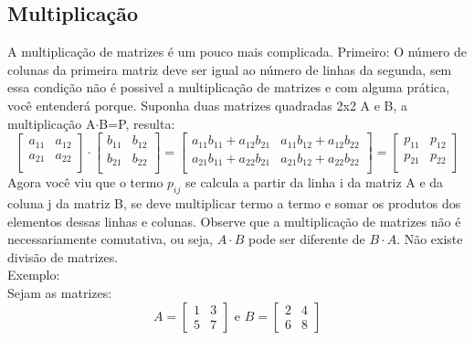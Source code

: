 \subsection{Multiplicação}
A multiplicação de matrizes é um pouco mais complicada. Primeiro: O número de colunas da primeira matriz deve ser igual ao número de linhas da segunda, sem essa condição não é possivel a multiplicação de matrizes e com alguma prática, você entenderá porque. 
Suponha duas matrizes quadradas 2x2 A e B, a multiplicação A$\cdot$B=P, resulta: 
\begin{displaymath}
\begin{bmatrix}
  a_{11} & a_{12}\\ a_{21} & a_{22}\\
\end{bmatrix}
\cdot
\begin{bmatrix}
  b_{11} & b_{12}\\ b_{21} & b_{22}\\
  \end{bmatrix}
=
\begin{bmatrix}
  a_{11}b_{11}+a_{12}b_{21} & a_{11}b_{12}+a_{12}b_{22} \\
  a_{21}b_{11}+a_{22}b_{21} & a_{21}b_{12}+a_{22}b_{22} \\
\end{bmatrix}
 =
\begin{bmatrix}
   p_{11} & p_{12} \\ p_{21} & p_{22} \\
\end{bmatrix}
\end{displaymath}
Agora você viu que o termo $p_{ij}$ se calcula a partir da linha i da matriz A e da coluna j da matriz B, se deve multiplicar termo a termo e somar os produtos dos elementos dessas linhas e colunas. Observe que a multiplicação de matrizes não é necessariamente comutativa, ou seja, $A\cdot B$ pode ser diferente de $B\cdot A$. Não existe divisão de matrizes.\\
Exemplo:\\
Sejam as matrizes:
\begin{displaymath}
  A=
  \begin{bmatrix}
    1 & 3 \\ 5 & 7
  \end{bmatrix}
  \text{ e }
  B=
  \begin{bmatrix}
    2 & 4 \\ 6 & 8
  \end{bmatrix}
\end{displaymath}
